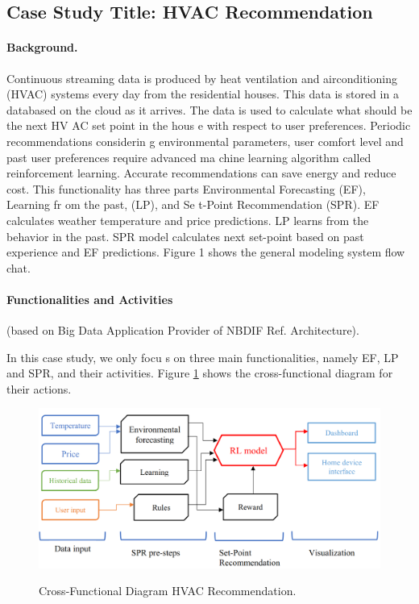 \subsection{Case Study Title: HVAC Recommendation}


\paragraph*{Background.}

Continuous streaming data is produced by heat ventilation and airconditioning (HVAC) systems every
day from the residential houses. This data is stored in a databased on the cloud as it arrives. The data
is used to calculate what should be the next HV AC set point in the hous e with respect to user
preferences. Periodic recommendations considerin g environmental parameters, user comfort level
and past user preferences require advanced ma chine learning algorithm called reinforcement
learning. Accurate recommendations can save energy and reduce cost. This functionality has three
parts Environmental Forecasting (EF), Learning fr om the past, (LP), and Se t-Point Recommendation
(SPR). EF calculates weather temperature and price predictions. LP learns from the behavior in the
past. SPR model calculates next set-point based on past experience and EF predictions. Figure 1 shows
the general modeling system flow chat.

\paragraph*{Functionalities and Activities} (based on Big Data Application Provider of NBDIF Ref. Architecture).


In this case study, we only focu s on three main functionalities, namely EF, LP and SPR, and their
activities. Figure \ref{fig:hvac} shows the cross-functional diagram for their actions.



\begin{figure}[htb]
\includegraphics[width=1.0\textwidth]{usecase/hvac.png}
\label{fig:hvac}
\caption{Cross-Functional Diagram HVAC Recommendation.}
\end{figure}


